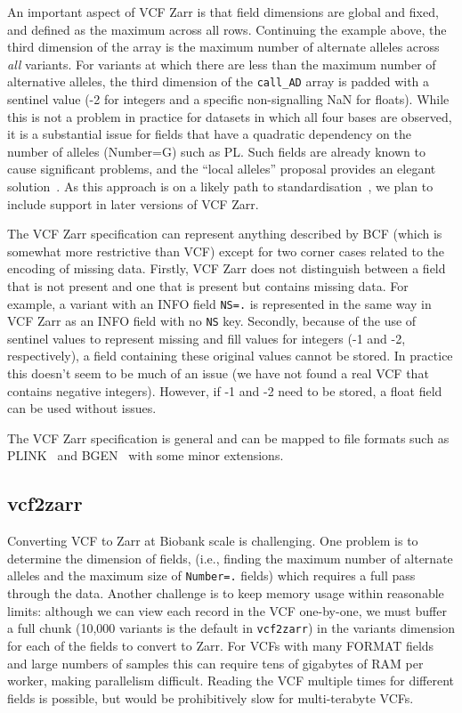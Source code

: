 \documentclass[a4paper,num-refs]{oup-contemporary}
\begin{document}
An important aspect of VCF Zarr is that field dimensions are
global and fixed, and defined as the maximum across all rows.
Continuing the example above, the third dimension of the array
is the maximum number of alternate alleles across \emph{all}
variants. For variants at which there are less than the maximum
number of alternative alleles, the third dimension of the
\texttt{call\_AD} array
is padded with a sentinel value (-2 for integers and a specific
non-signalling NaN for floats). While this is not a problem
in practice for datasets in which all four bases are observed,
it is a substantial issue for
fields that have a quadratic dependency on the number of alleles
(Number=G) such as PL. Such fields are already known to cause
significant problems, and the ``local alleles'' proposal
provides an elegant solution~\cite{poterba2024scalable}.
As this approach is on a likely path to
standardisation~\cite{danecek2021twelve}, we plan to
include support in later versions of VCF Zarr.

The VCF Zarr specification can represent anything described by BCF
(which is somewhat more restrictive than VCF) except for two corner
cases related to the encoding of missing data. Firstly, VCF Zarr does
not distinguish between a field that is not present and one that
is present but contains missing data. For example, a variant with an
INFO field \texttt{NS=.} is represented in the same way in VCF Zarr
as an INFO field with no \texttt{NS} key. Secondly, because of the use
of sentinel values to represent missing and fill values for integers
(-1 and -2, respectively), a field containing these original values
cannot be stored. In practice this doesn't seem to be much of
an issue (we have not found a real VCF that contains negative
integers). However, if -1 and -2 need to be stored, a float field
can be used without issues.

The VCF Zarr specification is general and can be mapped to
file formats such as PLINK~\citep{purcell2007plink,chang2015second}
and BGEN~\citep{band2018bgen} with some minor extensions.

\subsection{vcf2zarr}
Converting VCF to Zarr at Biobank scale is challenging.
One problem is to determine the dimension of fields,
(i.e., finding the maximum number of alternate alleles and the
maximum size of \texttt{Number=.} fields) which requires a full
pass through the data. Another challenge is to keep
memory usage within reasonable limits: although
we can view each record in the VCF one-by-one,
we must buffer a full chunk (10,000 variants is the default in
\texttt{vcf2zarr})
in the variants dimension for each of the fields to convert to Zarr.
For VCFs with many FORMAT fields and large numbers of samples this can
require tens of gigabytes of RAM per worker, making
parallelism difficult. Reading the VCF multiple times for different fields
is possible, but would be prohibitively slow for multi-terabyte VCFs.
\end{document}
